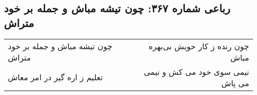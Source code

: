 \begin{center}
\section*{رباعی شماره ۳۶۷: چون تیشه مباش و جمله بر خود متراش}
\label{sec:sh367}
\begin{longtable}{l p{0.5cm} r}
چون تیشه مباش و جمله بر خود متراش
&&
چون رنده ز کار خویش بی‌بهره مباش
\\
تعلیم ز اره گیر در امر معاش
&&
نیمی سوی خود می کش و نیمی می پاش
\\
\end{longtable}
\end{center}
